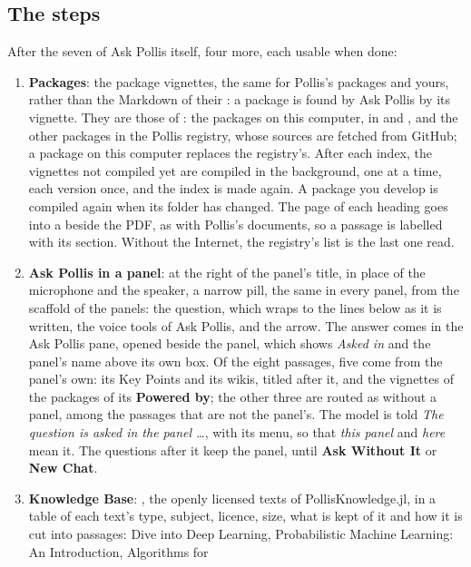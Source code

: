 \subsection{The steps}
After the seven of Ask Pollis itself, four more, each usable when done:
\begin{enumerate}[start=8, leftmargin=*]
  \item \textbf{Packages}: the package vignettes, the same for Pollis's packages and yours, rather than the Markdown
    of their : a package is found by Ask Pollis by its vignette. They are those of
    : the packages on this computer, in 
    and , and the other packages in the Pollis registry, whose sources are fetched from GitHub; a
    package on this computer replaces the registry's. After each index, the vignettes not compiled yet are compiled in
    the background, one at a time, each version once, and the index is made again. A package you develop is compiled
    again when its  folder has changed. The page of each heading goes into a  beside the
    PDF, as with Pollis's documents, so a passage is labelled with its section. Without the Internet, the registry's
    list is the last one read.
  \item \textbf{Ask Pollis in a panel}: at the right of the panel's title, in place of the microphone and the
    speaker, a narrow pill, the same in every panel, from the scaffold of the panels: the question, which wraps to the
    lines below as it is written, the voice tools of Ask Pollis, and the arrow. The answer comes in
    the Ask Pollis pane, opened beside the panel, which shows \emph{Asked in} and the panel's name above its
    own box. Of the eight passages, five come from the panel's own: its Key Points and its wikis, titled after it, and the vignettes of
    the packages of its \textbf{Powered by}; the other three are routed as without a panel, among the passages that
    are not the panel's. The model is told \emph{The question is asked in the panel \ldots}, with its menu, so that
    \emph{this panel} and \emph{here} mean it. The questions after it keep the panel, until \textbf{Ask Without It}
    or \textbf{New Chat}.
  \item \textbf{Knowledge Base}: , the openly licensed
    texts of PollisKnowledge.jl, in a table of each text's type, subject, licence, size, what is kept of it and how it
    is cut into passages: Dive into Deep Learning, Probabilistic Machine Learning: An Introduction, Algorithms for

\end{enumerate}

